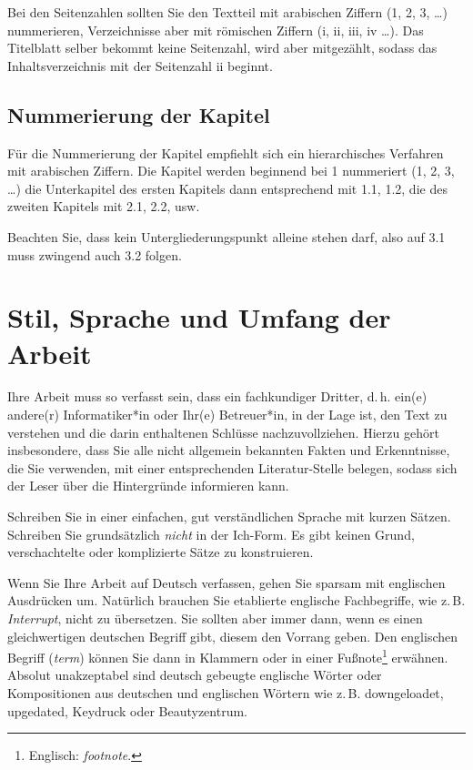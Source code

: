 \documentclass[a4paper,11pt,headings=normal]{scrartcl}
\begin{document}
Bei den Seitenzahlen sollten Sie den Textteil mit arabischen Ziffern (1, 2, 3, \dots) nummerieren, Verzeichnisse aber mit römischen Ziffern (i, ii, iii, iv \dots). Das Titelblatt selber bekommt keine Seitenzahl, wird aber mitgezählt, sodass das Inhaltsverzeichnis mit der Seitenzahl ii beginnt.

\subsection{Nummerierung der Kapitel}
Für die Nummerierung der Kapitel empfiehlt sich ein hierarchisches Verfahren mit arabischen Ziffern. Die Kapitel werden beginnend bei 1 nummeriert (1, 2, 3, \dots) die Unterkapitel des ersten Kapitels dann entsprechend mit 1.1, 1.2, die des zweiten Kapitels mit 2.1, 2.2, usw.

Beachten Sie, dass kein Untergliederungspunkt alleine stehen darf, also auf 3.1 muss zwingend auch 3.2 folgen.

\section{Stil, Sprache und Umfang der Arbeit}
Ihre Arbeit muss so verfasst sein, dass ein fachkundiger Dritter, d.\,h. ein(e) andere(r) Informatiker*in oder Ihr(e) Betreuer*in, in der Lage ist, den Text zu verstehen und die darin enthaltenen Schlüsse nachzuvollziehen. Hierzu gehört insbesondere, dass Sie alle nicht allgemein bekannten Fakten und Erkenntnisse, die Sie verwenden, mit einer entsprechenden Literatur-Stelle belegen, sodass sich der Leser über die Hintergründe informieren kann.

Schreiben Sie in einer einfachen, gut verständlichen Sprache mit kurzen Sätzen. Schreiben Sie grundsätzlich \textit{nicht} in der Ich-Form. Es gibt keinen Grund, verschachtelte oder komplizierte Sätze zu konstruieren.

Wenn Sie Ihre Arbeit auf Deutsch verfassen, gehen Sie sparsam mit englischen Ausdrücken um. Natürlich brauchen Sie etablierte englische Fachbegriffe, wie z.\,B. \textit{Interrupt}, nicht zu übersetzen. Sie sollten aber immer dann, wenn es einen gleichwertigen deutschen Begriff gibt, diesem den Vorrang geben. Den englischen Begriff (\textit{term}) können Sie dann in Klammern oder in einer Fußnote\footnote{Englisch: \textit{footnote}.} erwähnen. Absolut unakzeptabel sind deutsch gebeugte englische Wörter oder Kompositionen aus deutschen und englischen Wörtern wie z.\,B. downgeloadet, upgedated, Keydruck oder Beautyzentrum.
\end{document}
